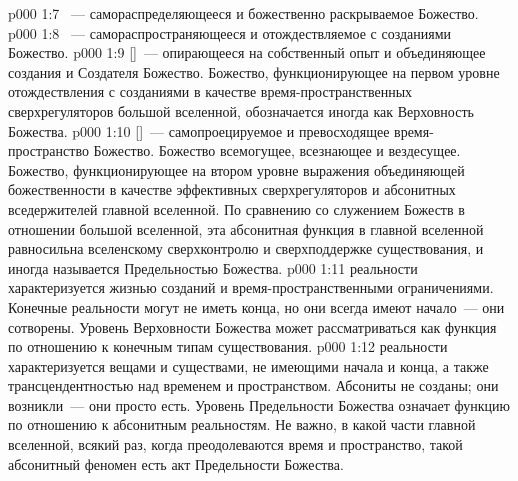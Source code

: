 \vs p000 1:7 ~--- самораспределяющееся и божественно раскрываемое Божество.
\vs p000 1:8 ~--- самораспространяющееся и отождествляемое с созданиями Божество.
\vs p000 1:9  []~--- опирающееся на собственный опыт и объединяющее создания и Создателя Божество. Божество, функционирующее на первом уровне отождествления с созданиями в качестве время\hyp{}пространственных сверхрегуляторов большой вселенной, обозначается иногда как Верховность Божества.
\vs p000 1:10  []~--- самопроецируемое и превосходящее время\hyp{}пространство Божество. Божество всемогущее, всезнающее и вездесущее. Божество, функционирующее на втором уровне выражения объединяющей божественности в качестве эффективных сверхрегуляторов и абсонитных вседержителей главной вселенной. По сравнению со служением Божеств в отношении большой вселенной, эта абсонитная функция в главной вселенной равносильна вселенскому сверхконтролю и сверхподдержке существования, и иногда называется Предельностью Божества.
\vs p000 1:11 \pc {} реальности характеризуется жизнью созданий и время\hyp{}пространственными ограничениями. Конечные реальности могут не иметь конца, но они всегда имеют начало~--- они сотворены. Уровень Верховности Божества может рассматриваться как функция по отношению к конечным типам существования.
\vs p000 1:12 \pc {}  реальности характеризуется вещами и существами, не имеющими начала и конца, а также трансцендентностью над временем и пространством. Абсониты не созданы; они возникли~--- они просто есть. Уровень Предельности Божества означает функцию по отношению к абсонитным реальностям. Не важно, в какой части главной вселенной, всякий раз, когда преодолеваются время и пространство, такой абсонитный феномен есть акт Предельности Божества.
